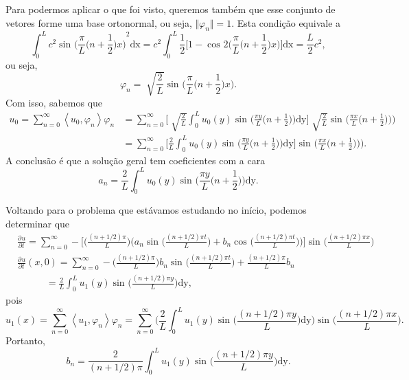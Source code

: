 \documentclass[../pde_notes.tex]{subfiles}
\begin{document}
Para podermos aplicar o que foi visto, queremos também que esse conjunto de vetores forme uma base ortonormal, ou seja, \(\Vert \varphi_{n} \Vert = 1.\) Esta condição equivale a
\[
	\int_{0}^{L}c^{2}\sin^{}{\biggl(\frac{\pi }{L}\biggl(n+\frac{1}{2}\biggr)x\biggr)}^{2} \mathrm{dx} = c^{2}\int_{0}^{L}\frac{1}{2}\biggl[1-\cos^{}{2\biggl(\frac{\pi }{L}\biggl(n+\frac{1}{2}\biggr)x\biggr)}\biggr] \mathrm{dx} = \frac{L}{2}c^{2},
\]
ou seja,
\[
	\varphi_{n} = \sqrt[]{\frac{2}{L}}\sin^{}{\biggl(\frac{\pi }{L}\biggl(n+\frac{1}{2}\biggr)x\biggr)}.
\]
Com isso, sabemos que
\begin{align*}
	u_{0} = \sum\limits_{n=0}^{\infty}\left< u_{0}, \varphi_{n} \right>\varphi_{n} & = \sum\limits_{n=0}^{\infty}\biggl[\sqrt[]{\frac{2}{L}}\int_{0}^{L}u_{0}(y)\sin^{}{\biggl(\frac{\pi y}{L}\biggl(n+\frac{1}{2}\biggr)\biggr)} \mathrm{dy}\biggr]\sqrt[]{\frac{2}{L}}\sin^{}{\biggl(\frac{\pi x}{L}\biggl(n+\frac{1}{2})\biggr)\biggr)} \\
	                                                                               & = \sum\limits_{n=0}^{\infty}\biggl[\frac{2}{L}\int_{0}^{L}u_{0}(y)\sin^{}{\biggl(\frac{\pi y}{L}\biggl(n+\frac{1}{2}\biggr)\biggr)} \mathrm{dy}\biggr]\sin^{}{\biggl(\frac{\pi x}{L}\biggl(n+\frac{1}{2})\biggr)\biggr)}.
\end{align*}
A conclusão é que a solução geral tem coeficientes com a cara
\[
	a_{n}=\frac{2}{L} \int_{0}^{L}u_{0}(y)\sin^{}{\biggl(\frac{\pi y}{L}\biggl(n+\frac{1}{2}\biggr)\biggr)} \mathrm{dy}.
\]

Voltando para o problema que estávamos estudando no início, podemos determinar que
\begin{align*}
	 & \frac{\partial^{}u}{\partial t^{}} = \sum\limits_{n=0}^{\infty}-\biggl[\biggl(\frac{(n+1/2)\pi }{L}\biggr)\biggl(a_{n}\sin^{}{\biggl(\frac{(n+1/2)\pi t}{L}\biggr)}+b_{n}\cos^{}{\biggl(\frac{(n+1/2)\pi t}{L}\biggr)}\biggr)\biggr]\sin^{}{\biggl(\frac{(n+1/2)\pi x}{L}\biggr)} \\
	 & \frac{\partial^{}u}{\partial t^{}}(x, 0)=\sum\limits_{n=0}^{\infty}-\biggl(\frac{(n+1/2)\pi }{L}\biggr)b_{n}\sin^{}{\biggl(\frac{(n+1/2)\pi t}{L}\biggr)}+\frac{(n+1/2)\pi }{L}b_{n}                                                                                              \\
	 & \quad \quad \quad =\frac{2}{L}\int_{0}^{L}u_{1}(y)\sin^{}{\biggl(\frac{(n+1/2)\pi y}{L}\biggr)} \mathrm{dy}                                                                                                                                                                     ,
\end{align*}
pois
\[
	u_{1}(x) = \sum\limits_{n=0}^{\infty}\left< u_{1}, \varphi_{n} \right>\varphi_{n} = \sum\limits_{n=0}^{\infty}\biggl(\frac{2}{L}\int_{0}^{L}u_{1}(y)\sin^{}{\biggl(\frac{(n+1/2)\pi y}{L}\biggr)} \mathrm{dy}\biggr)\sin^{}{\biggl(\frac{(n+1/2)\pi x}{L}\biggr)}.
\]
Portanto,
\[
	b_{n}= \frac{2}{(n+1/2)\pi }\int_{0}^{L}u_{1}(y)\sin^{}{\biggl(\frac{(n+1/2)\pi y}{L}\biggr)} \mathrm{dy}.
\]
\end{document}
